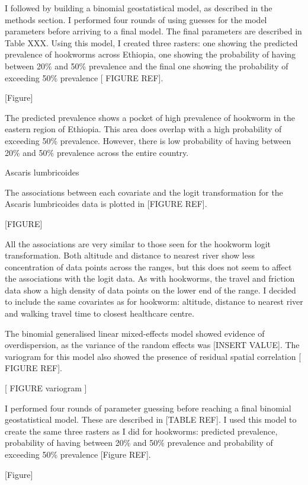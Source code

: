 \documentclass[
]{article}
\begin{document}
I followed by building a binomial geostatistical model, as described in
the methods section. I performed four rounds of using guesses for the
model parameters before arriving to a final model. The final parameters
are described in Table XXX. Using this model, I created three rasters:
one showing the predicted prevalence of hookworms across Ethiopia, one
showing the probability of having between 20\% and 50\% prevalence and
the final one showing the probability of exceeding 50\% prevalence {[}
FIGURE REF{]}.

{[}Figure{]}

The predicted prevalence shows a pocket of high prevalence of hookworm
in the eastern region of Ethiopia. This area does overlap with a high
probability of exceeding 50\% prevalence. However, there is low
probability of having between 20\% and 50\% prevalence across the entire
country.

Ascaris lumbricoides

The associations between each covariate and the logit transformation for
the Ascaris lumbricoides data is plotted in {[}FIGURE REF{]}.

{[}FIGURE{]}

All the associations are very similar to those seen for the hookworm
logit transformation. Both altitude and distance to nearest river show
less concentration of data points across the ranges, but this does not
seem to affect the associations with the logit data. As with hookworms,
the travel and friction data show a high density of data points on the
lower end of the range. I decided to include the same covariates as for
hookworm: altitude, distance to nearest river and walking travel time to
closest healthcare centre.

The binomial generalised linear mixed-effects model showed evidence of
overdispersion, as the variance of the random effects was {[}INSERT
VALUE{]}. The variogram for this model also showed the presence of
residual spatial correlation {[} FIGURE REF{]}.

{[} FIGURE variogram {]}

I performed four rounds of parameter guessing before reaching a final
binomial geostatistical model. These are described in {[}TABLE REF{]}. I
used this model to create the same three rasters as I did for hookworms:
predicted prevalence, probability of having between 20\% and 50\%
prevalence and probability of exceeding 50\% prevalence {[}Figure
REF{]}.

{[}Figure{]}
\end{document}
